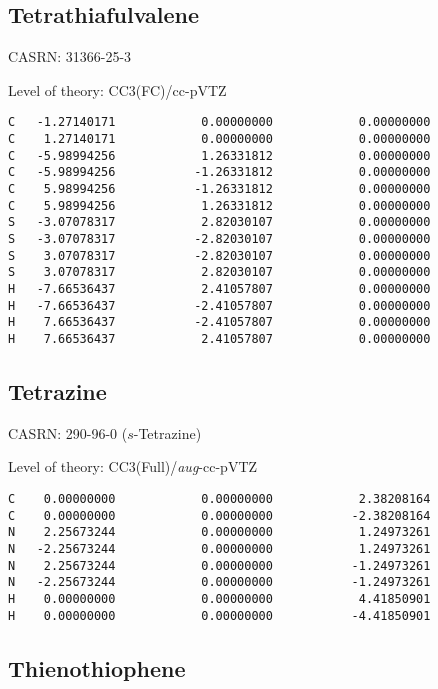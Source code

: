 \documentclass[journal=jctcce,manuscript=article,layout=traditional]{achemso}
\newcommand{\TZ}{cc-pVTZ}
\newcommand{\AVTZ}{\emph{aug}-cc-pVTZ}
\begin{document}
\subsection{Tetrathiafulvalene}

CASRN: 31366-25-3

\begin{singlespace}
\noindent Level of theory: CC3(FC)/{\TZ}
\begin{verbatim}
C   -1.27140171            0.00000000            0.00000000
C    1.27140171            0.00000000            0.00000000
C   -5.98994256            1.26331812            0.00000000
C   -5.98994256           -1.26331812            0.00000000
C    5.98994256           -1.26331812            0.00000000
C    5.98994256            1.26331812            0.00000000
S   -3.07078317            2.82030107            0.00000000
S   -3.07078317           -2.82030107            0.00000000
S    3.07078317           -2.82030107            0.00000000
S    3.07078317            2.82030107            0.00000000
H   -7.66536437            2.41057807            0.00000000
H   -7.66536437           -2.41057807            0.00000000
H    7.66536437           -2.41057807            0.00000000
H    7.66536437            2.41057807            0.00000000
\end{verbatim}
\end{singlespace}

\subsection{Tetrazine}

CASRN: 290-96-0 ($s$-Tetrazine)

\begin{singlespace}
\noindent Level of theory: CC3(Full)/{\AVTZ}
\begin{verbatim}
C    0.00000000            0.00000000            2.38208164
C    0.00000000            0.00000000           -2.38208164
N    2.25673244            0.00000000            1.24973261
N   -2.25673244            0.00000000            1.24973261
N    2.25673244            0.00000000           -1.24973261
N   -2.25673244            0.00000000           -1.24973261
H    0.00000000            0.00000000            4.41850901
H    0.00000000            0.00000000           -4.41850901
\end{verbatim}
\end{singlespace}

\subsection{Thienothiophene}
\end{document}
